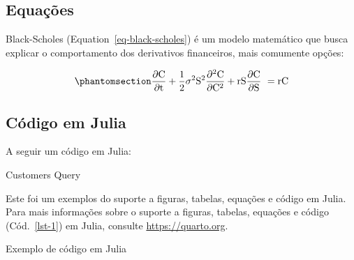 \documentclass[
  12pt,
  oneside,
  a4paper,
  english,
  brazil]{abntex2}
\newenvironment{Shaded}{}{}
\newcommand{\FloatTok}[1]{\textcolor[rgb]{0.00,0.36,0.77}{#1}}
\newcommand{\NormalTok}[1]{\textcolor[rgb]{0.14,0.16,0.18}{#1}}
\newcommand{\OperatorTok}[1]{\textcolor[rgb]{0.14,0.16,0.18}{#1}}
\begin{document}
\subsection{Equações}\label{equauxe7uxf5es}

Black-Scholes (Equation~\ref{eq-black-scholes}) é um modelo matemático
que busca explicar o comportamento dos derivativos financeiros, mais
comumente opções:

\begin{equation}\phantomsection\label{eq-black-scholes}{
\frac{\partial \mathrm C}{ \partial \mathrm t } + \frac{1}{2}\sigma^{2} \mathrm S^{2}
\frac{\partial^{2} \mathrm C}{\partial \mathrm C^2}
  + \mathrm r \mathrm S \frac{\partial \mathrm C}{\partial \mathrm S}\ =
  \mathrm r \mathrm C 
}\end{equation}

\subsection{Código em Julia}\label{cuxf3digo-em-julia}

A seguir um código em Julia:

\vspace{0cm}

\begin{codelisting}

\caption{\label{lst-1}Customers Query}

\centering{

\begin{Shaded}
\begin{Highlighting}[]
\NormalTok{x }\OperatorTok{=} \FloatTok{1} \OperatorTok{+} \FloatTok{1}
\end{Highlighting}
\end{Shaded}

}

\end{codelisting}%

Este foi um exemplos do suporte a figuras, tabelas, equações e código em
Julia. Para mais informações sobre o suporte a figuras, tabelas,
equações e código (Cód.~\ref{lst-1}) em Julia, consulte
\url{https://quarto.org}.

\begin{codelisting}

\caption{\label{lst-2}Exemplo de código em Julia}

\centering{

\begin{Shaded}
\begin{Highlighting}[]
\NormalTok{x }\OperatorTok{=} \FloatTok{1} \OperatorTok{+} \FloatTok{1}
\end{Highlighting}
\end{Shaded}

}

\end{codelisting}%
\end{document}
